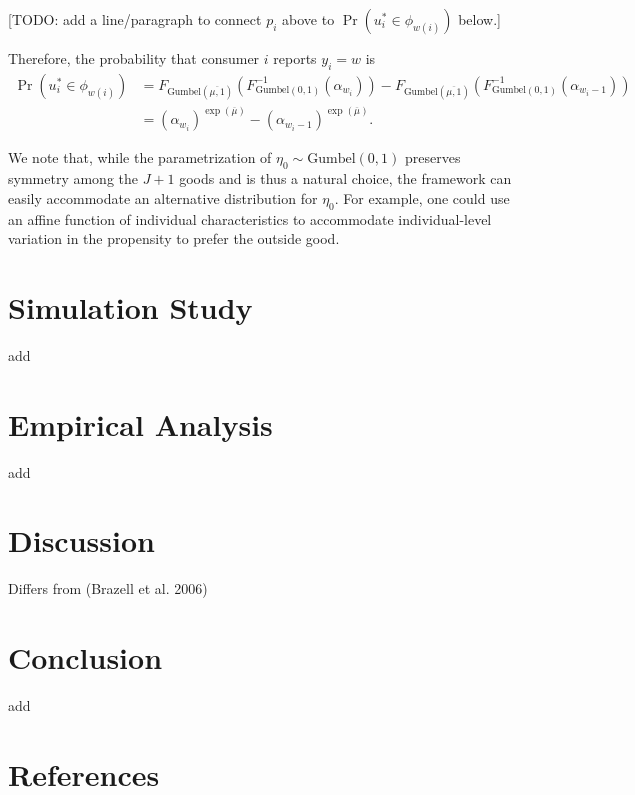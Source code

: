 \documentclass[
  letterpaper,
  DIV=11,
  numbers=noendperiod]{scrartcl}
\begin{document}
{[}TODO: add a line/paragraph to connect \(p_i\) above to
\(\Pr \left( u_i^* \in \phi_{w\left( i \right)} \right)\) below.{]}

Therefore, the probability that consumer \(i\) reports \(y_i=w\) is \[
\begin{aligned}
    \Pr \left( u_i^* \in \phi_{w\left( i \right)} \right) 
    &= F_{\text{Gumbel} \left( \overline{ \mu, 1 } \right) } \left( F^{-1}_{\text{Gumbel} \left( 0, 1 \right) } \left( \alpha_{w_i} \right) \right) - 
       F_{\text{Gumbel} \left( \overline{ \mu, 1 } \right) } \left( F^{-1}_{\text{Gumbel} \left( 0, 1 \right) } \left( \alpha_{w_i-1} \right) \right) \\
    &= \left( \alpha_{w_i} \right)^{\exp \left( \overline{\mu} \right)} - 
       \left({\alpha_{w_i-1}} \right)^{\exp \left( \overline{\mu} \right)}.
\end{aligned}
\]

We note that, while the parametrization of
\(\eta_0 \sim \text{Gumbel}\left(0,1\right)\) preserves symmetry among
the \(J+1\) goods and is thus a natural choice, the framework can easily
accommodate an alternative distribution for \(\eta_0\). For example, one
could use an affine function of individual characteristics to
accommodate individual-level variation in the propensity to prefer the
outside good.

\section{Simulation Study}\label{sec-simstudy}

add

\section{Empirical Analysis}\label{sec-analysis}

add

\section{Discussion}\label{sec-discussion}

Differs from (Brazell et al. 2006)

\section{Conclusion}\label{sec-conclusion}

add

\section*{References}\label{references}
\end{document}
